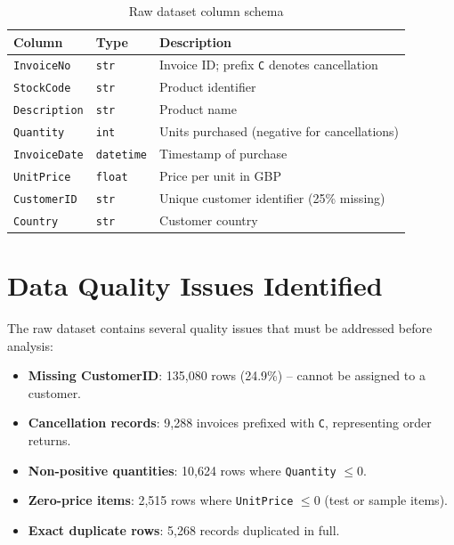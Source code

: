 \documentclass[12pt,a4paper]{report}
\begin{document}
\begin{table}[H]
\centering
\caption{Raw dataset column schema}
\begin{tabular}{lll}
\toprule
\textbf{Column} & \textbf{Type} & \textbf{Description} \\
\midrule
\texttt{InvoiceNo} & \texttt{str} & Invoice ID; prefix \texttt{C} denotes cancellation \\
\texttt{StockCode} & \texttt{str} & Product identifier \\
\texttt{Description} & \texttt{str} & Product name \\
\texttt{Quantity} & \texttt{int} & Units purchased (negative for cancellations) \\
\texttt{InvoiceDate} & \texttt{datetime} & Timestamp of purchase \\
\texttt{UnitPrice} & \texttt{float} & Price per unit in GBP \\
\texttt{CustomerID} & \texttt{str} & Unique customer identifier (25\% missing) \\
\texttt{Country} & \texttt{str} & Customer country \\
\bottomrule
\end{tabular}
\end{table}

\section{Data Quality Issues Identified}

The raw dataset contains several quality issues that must be addressed before analysis:
\begin{itemize}[leftmargin=1.8em]
  \item \textbf{Missing CustomerID}: 135,080 rows (24.9\%) -- cannot be assigned to a customer.
  \item \textbf{Cancellation records}: 9,288 invoices prefixed with \texttt{C}, representing order returns.
  \item \textbf{Non-positive quantities}: 10,624 rows where \texttt{Quantity} $\le 0$.
  \item \textbf{Zero-price items}: 2,515 rows where \texttt{UnitPrice} $\le 0$ (test or sample items).
  \item \textbf{Exact duplicate rows}: 5,268 records duplicated in full.
\end{itemize}

\end{document}
